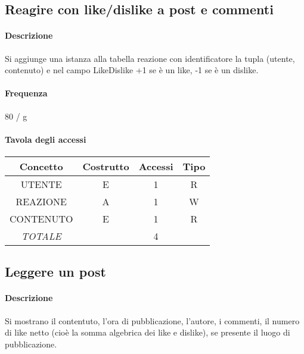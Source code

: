 \documentclass[a4paper,12pt]{report}
\begin{document}
\subsection{Reagire con like/dislike a post e commenti} \label{like}
\paragraph{Descrizione} Si aggiunge una istanza alla tabella reazione con identificatore la tupla (utente, contenuto) e nel campo LikeDislike +1 se è un like, -1 se è un dislike.
\paragraph{Frequenza} 80 / g
\begin{table}[h]
\paragraph{Tavola degli accessi\newline}
\begin{tabular}{|c|c|c|c|}
\hline
Concetto        & Costrutto & Accessi & Tipo \\ \hline
UTENTE          & E         & 1       & R    \\ \hline
REAZIONE        & A         & 1       & W    \\ \hline
CONTENUTO       & E         & 1       & R    \\ \hline
\textit{TOTALE} &           & 4       &      \\ \hline
\end{tabular}
\end{table}
\subsection{Leggere un post} \label{leggere_post}
\paragraph{Descrizione} Si mostrano il contentuto, l'ora di pubblicazione, l'autore, i commenti, il numero di like netto (cioè la somma algebrica dei like e dislike), se presente il luogo di pubblicazione.
\end{document}
